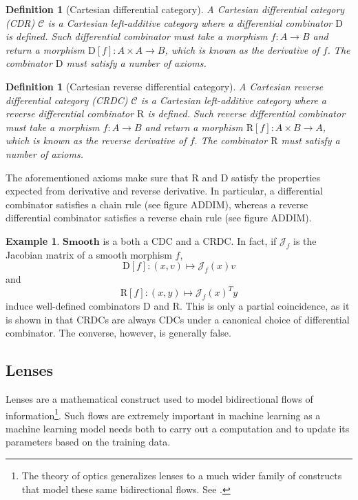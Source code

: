 \documentclass[11pt,a4paper,openright,twoside]{report}
\theoremstyle{plain}
\newtheorem{definition}[proposition]{Definition}
\theoremstyle{definition}
\newtheorem{example}[proposition]{Example}
\begin{document}
\begin{definition}[Cartesian differential category]
  A Cartesian differential category (CDR) $\mathcal{C}$ is a Cartesian left-additive category where a differential combinator $\mathrm{D}$ is defined. Such differential combinator must take a morphism $f: A \to B$ and return a morphism $\mathrm{D}[f]: A \times A \to B$, which is known as the derivative of $f$. The combinator $\mathrm{D}$ must satisfy a number of axioms. 
\end{definition}

\begin{definition}[Cartesian reverse differential category]
  A Cartesian reverse differential category (CRDC) $\mathcal{C}$ is a Cartesian left-additive category where a reverse differential combinator $\mathrm{R}$ is defined. Such reverse differential combinator must take a morphism $f: A \to B$ and return a morphism $\mathrm{R}[f]: A \times B \to A$, which is known as the reverse derivative of $f$. The combinator $\mathrm{R}$ must satisfy a number of axioms. 
\end{definition}


The aforementioned axioms make sure that $\mathrm{R}$ and $\mathrm{D}$ satisfy the properties expected from derivative and reverse derivative. In particular, a differential combinator satisfies a chain rule (see figure ADDIM), whereas a reverse differential combinator satisfies a reverse chain rule (see figure ADDIM).


\begin{example}
  $\mathbf{Smooth}$ is a both a CDC and a CRDC. In fact, if $\mathcal{J}_f$ is the Jacobian matrix of a smooth morphism $f$,
  \[\mathrm{D}[f]: (x,v) \mapsto \mathcal{J}_f(x)v\]
  and
  \[\mathrm{R}[f]: (x,y) \mapsto \mathcal{J}_f(x)^Ty\]
  induce well-defined combinators $\mathrm{D}$ and $\mathrm{R}$. This is only a partial coincidence, as it is shown in \cite{cockettReverseDerivativeCategories2019} that CRDCs are always CDCs under a canonical choice of differential combinator. The converse, however, is generally false.
\end{example}



\subsection{Lenses}\label{subsec: lenses}

Lenses are a mathematical construct used to model bidirectional flows of information\footnote{The theory of optics generalizes lenses to a much wider family of constructs that model these same bidirectional flows. See \cite{rileyCategoriesOptics2018}.}. Such flows are extremely important in machine learning as a machine learning model needs both to carry out a computation and to update its parameters based on the training data.
\end{document}
